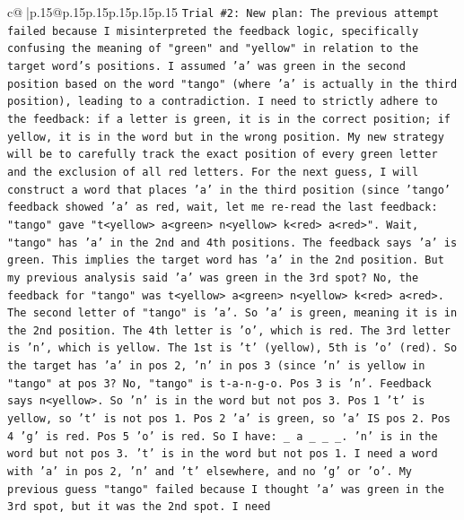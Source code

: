 \documentclass{article}
\begin{document}
{\begin{supertabular}{c@{$\;$}|p{.15\linewidth}@{}p{.15\linewidth}p{.15\linewidth}p{.15\linewidth}p{.15\linewidth}p{.15\linewidth}}
{{{\texttt{Trial \#2: New plan: The previous attempt failed because I misinterpreted the feedback logic, specifically confusing the meaning of "green" and "yellow" in relation to the target word's positions. I assumed 'a' was green in the second position based on the word "tango" (where 'a' is actually in the third position), leading to a contradiction. I need to strictly adhere to the feedback: if a letter is green, it is in the correct position; if yellow, it is in the word but in the wrong position. My new strategy will be to carefully track the exact position of every green letter and the exclusion of all red letters. For the next guess, I will construct a word that places 'a' in the third position (since 'tango' feedback showed 'a' as red, wait, let me re{-}read the last feedback: "tango" gave "t<yellow> a<green> n<yellow> k<red> a<red>". Wait, "tango" has 'a' in the 2nd and 4th positions. The feedback says 'a' is green. This implies the target word has 'a' in the 2nd position. But my previous analysis said 'a' was green in the 3rd spot? No, the feedback for "tango" was t<yellow> a<green> n<yellow> k<red> a<red>. The second letter of "tango" is 'a'. So 'a' is green, meaning it is in the 2nd position. The 4th letter is 'o', which is red. The 3rd letter is 'n', which is yellow. The 1st is 't' (yellow), 5th is 'o' (red). So the target has 'a' in pos 2, 'n' in pos 3 (since 'n' is yellow in "tango" at pos 3? No, "tango" is t{-}a{-}n{-}g{-}o. Pos 3 is 'n'. Feedback says n<yellow>. So 'n' is in the word but not pos 3. Pos 1 't' is yellow, so 't' is not pos 1. Pos 2 'a' is green, so 'a' IS pos 2. Pos 4 'g' is red. Pos 5 'o' is red. So I have: \_ a \_ \_ \_. 'n' is in the word but not pos 3. 't' is in the word but not pos 1. I need a word with 'a' in pos 2, 'n' and 't' elsewhere, and no 'g' or 'o'. My previous guess "tango" failed because I thought 'a' was green in the 3rd spot, but it was the 2nd spot. I need} \\
\\ 
}}}
\end{supertabular}}
\end{document}
